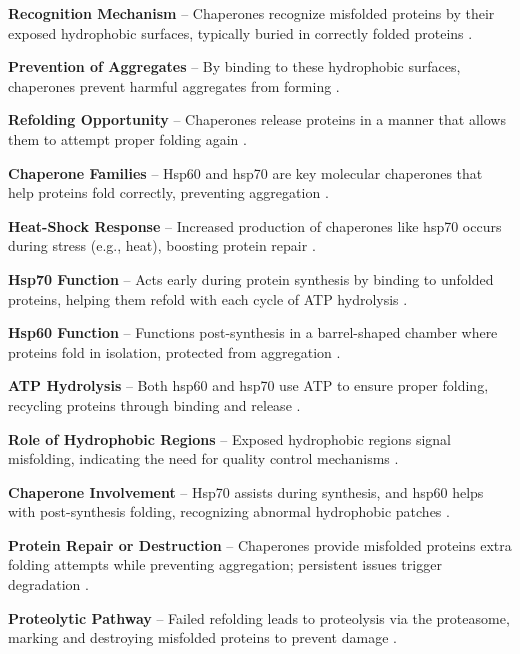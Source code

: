 \textbf{Recognition Mechanism} – Chaperones recognize misfolded proteins by their exposed hydrophobic surfaces, typically buried in correctly folded proteins \cite*{L1-Chapter6}.

\textbf{Prevention of Aggregates} – By binding to these hydrophobic surfaces, chaperones prevent harmful aggregates from forming \cite*{L1-Chapter6}.

\textbf{Refolding Opportunity} – Chaperones release proteins in a manner that allows them to attempt proper folding again \cite*{L1-Chapter6}.



\textbf{Chaperone Families} – Hsp60 and hsp70 are key molecular chaperones that help proteins fold correctly, preventing aggregation \cite*{L1-Chapter6}.

\textbf{Heat-Shock Response} – Increased production of chaperones like hsp70 occurs during stress (e.g., heat), boosting protein repair \cite*{L1-Chapter6}.

\textbf{Hsp70 Function} – Acts early during protein synthesis by binding to unfolded proteins, helping them refold with each cycle of ATP hydrolysis \cite*{L1-Chapter6}.

\textbf{Hsp60 Function} – Functions post-synthesis in a barrel-shaped chamber where proteins fold in isolation, protected from aggregation \cite*{L1-Chapter6}.

\textbf{ATP Hydrolysis} – Both hsp60 and hsp70 use ATP to ensure proper folding, recycling proteins through binding and release \cite*{L1-Chapter6}.



\textbf{Role of Hydrophobic Regions} – Exposed hydrophobic regions signal misfolding, indicating the need for quality control mechanisms \cite*{L1-Chapter6}.

\textbf{Chaperone Involvement} – Hsp70 assists during synthesis, and hsp60 helps with post-synthesis folding, recognizing abnormal hydrophobic patches \cite*{L1-Chapter6}.

\textbf{Protein Repair or Destruction} – Chaperones provide misfolded proteins extra folding attempts while preventing aggregation; persistent issues trigger degradation \cite*{L1-Chapter6}.

\textbf{Proteolytic Pathway} – Failed refolding leads to proteolysis via the proteasome, marking and destroying misfolded proteins to prevent damage \cite*{L1-Chapter6}.


